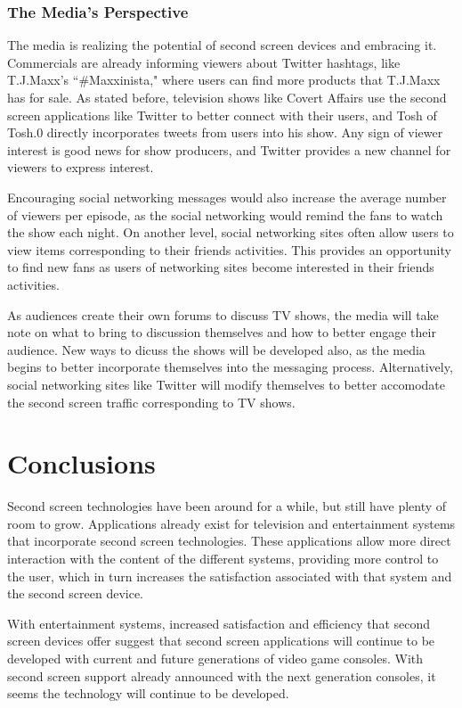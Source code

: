 \documentclass[11pt, oneside]{article}
\begin{document}
\subsubsection{The Media's Perspective}
The media is realizing the potential of second screen devices and embracing it. Commercials are already informing viewers about Twitter hashtags, like T.J.Maxx's ``\#Maxxinista," where users can find more products that T.J.Maxx has for sale. As stated before, television shows like Covert Affairs use the second screen applications like Twitter to better connect with their users, and Tosh of Tosh.0 directly incorporates tweets from users into his show. Any sign of viewer interest is good news for show producers, and Twitter provides a new channel for viewers to express interest. 

Encouraging social networking messages would also increase the average number of viewers per episode, as the social networking would remind the fans to watch the show each night. On another level, social networking sites often allow users to view items corresponding to their friends activities. This provides an opportunity to find new fans as users of networking sites become interested in their friends activities.

As audiences create their own forums to discuss TV shows, the media will take note on what to bring to discussion themselves and how to better engage their audience. New ways to dicuss the shows will be developed also, as the media begins to better incorporate themselves into the messaging process. Alternatively, social networking sites like Twitter will modify themselves to better accomodate the second screen traffic corresponding to TV shows. 

\section{Conclusions}
Second screen technologies have been around for a while, but still have plenty of room to grow. Applications already exist for television and entertainment systems that incorporate second screen technologies. These applications allow more direct interaction with the content of the different systems, providing more control to the user, which in turn increases the satisfaction associated with that system and the second screen device. 
 
With entertainment systems, increased satisfaction and efficiency that second screen devices offer suggest that second screen applications will continue to be developed with current and future generations of video game consoles. With second screen support already announced with the next generation consoles, it seems the technology will continue to be developed. 
\end{document}

